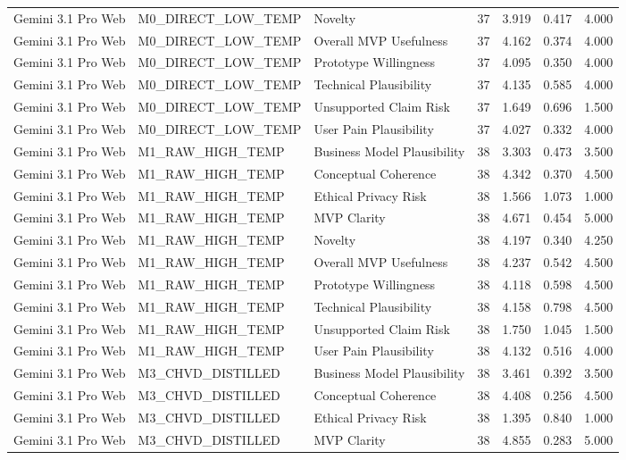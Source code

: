 \documentclass[10pt]{article}
\begin{document}
\begin{landscape}
\begin{longtable}{lllrrrr}
Gemini 3.1 Pro Web & M0\_DIRECT\_LOW\_TEMP & Novelty & 37 & 3.919 & 0.417 & 4.000 \\
Gemini 3.1 Pro Web & M0\_DIRECT\_LOW\_TEMP & Overall MVP Usefulness & 37 & 4.162 & 0.374 & 4.000 \\
Gemini 3.1 Pro Web & M0\_DIRECT\_LOW\_TEMP & Prototype Willingness & 37 & 4.095 & 0.350 & 4.000 \\
Gemini 3.1 Pro Web & M0\_DIRECT\_LOW\_TEMP & Technical Plausibility & 37 & 4.135 & 0.585 & 4.000 \\
Gemini 3.1 Pro Web & M0\_DIRECT\_LOW\_TEMP & Unsupported Claim Risk & 37 & 1.649 & 0.696 & 1.500 \\
Gemini 3.1 Pro Web & M0\_DIRECT\_LOW\_TEMP & User Pain Plausibility & 37 & 4.027 & 0.332 & 4.000 \\
Gemini 3.1 Pro Web & M1\_RAW\_HIGH\_TEMP & Business Model Plausibility & 38 & 3.303 & 0.473 & 3.500 \\
Gemini 3.1 Pro Web & M1\_RAW\_HIGH\_TEMP & Conceptual Coherence & 38 & 4.342 & 0.370 & 4.500 \\
Gemini 3.1 Pro Web & M1\_RAW\_HIGH\_TEMP & Ethical Privacy Risk & 38 & 1.566 & 1.073 & 1.000 \\
Gemini 3.1 Pro Web & M1\_RAW\_HIGH\_TEMP & MVP Clarity & 38 & 4.671 & 0.454 & 5.000 \\
Gemini 3.1 Pro Web & M1\_RAW\_HIGH\_TEMP & Novelty & 38 & 4.197 & 0.340 & 4.250 \\
Gemini 3.1 Pro Web & M1\_RAW\_HIGH\_TEMP & Overall MVP Usefulness & 38 & 4.237 & 0.542 & 4.500 \\
Gemini 3.1 Pro Web & M1\_RAW\_HIGH\_TEMP & Prototype Willingness & 38 & 4.118 & 0.598 & 4.500 \\
Gemini 3.1 Pro Web & M1\_RAW\_HIGH\_TEMP & Technical Plausibility & 38 & 4.158 & 0.798 & 4.500 \\
Gemini 3.1 Pro Web & M1\_RAW\_HIGH\_TEMP & Unsupported Claim Risk & 38 & 1.750 & 1.045 & 1.500 \\
Gemini 3.1 Pro Web & M1\_RAW\_HIGH\_TEMP & User Pain Plausibility & 38 & 4.132 & 0.516 & 4.000 \\
Gemini 3.1 Pro Web & M3\_CHVD\_DISTILLED & Business Model Plausibility & 38 & 3.461 & 0.392 & 3.500 \\
Gemini 3.1 Pro Web & M3\_CHVD\_DISTILLED & Conceptual Coherence & 38 & 4.408 & 0.256 & 4.500 \\
Gemini 3.1 Pro Web & M3\_CHVD\_DISTILLED & Ethical Privacy Risk & 38 & 1.395 & 0.840 & 1.000 \\
Gemini 3.1 Pro Web & M3\_CHVD\_DISTILLED & MVP Clarity & 38 & 4.855 & 0.283 & 5.000 \\

\end{longtable}
\end{landscape}
\end{document}
